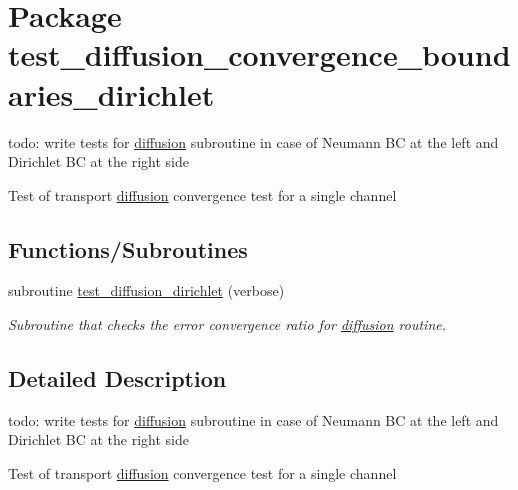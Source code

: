 \hypertarget{a00080}{
\section{Package test\_\-diffusion\_\-convergence\_\-boundaries\_\-dirichlet}
\label{a00080}
}
todo: write tests for \hyperlink{a00056}{diffusion} subroutine in case of Neumann BC at the left and Dirichlet BC at the right side

Test of transport \hyperlink{a00056}{diffusion} convergence test for a single channel  


\subsection*{Functions/Subroutines}
\begin{CompactItemize}
\item 
\hypertarget{a00080_883e9422d06816e34c1577b7a371af7b}{
subroutine \hyperlink{a00080_883e9422d06816e34c1577b7a371af7b}{test\_\-diffusion\_\-dirichlet} (verbose)}
\label{a00080_883e9422d06816e34c1577b7a371af7b}

\begin{CompactList}\small\item\em Subroutine that checks the error convergence ratio for \hyperlink{a00056}{diffusion} routine. \item\end{CompactList}\end{CompactItemize}


\subsection{Detailed Description}
todo: write tests for \hyperlink{a00056}{diffusion} subroutine in case of Neumann BC at the left and Dirichlet BC at the right side

Test of transport \hyperlink{a00056}{diffusion} convergence test for a single channel 

